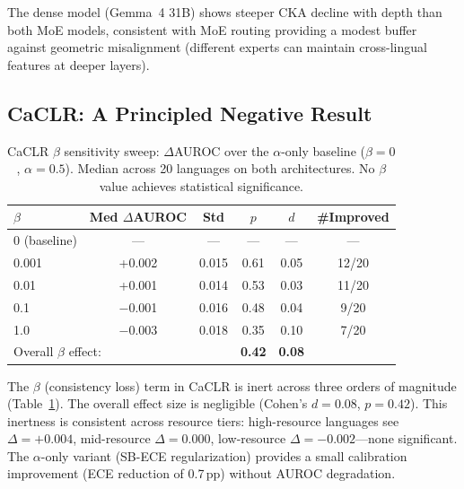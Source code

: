 \documentclass[11pt,a4paper]{article}
\begin{document}
The dense model (Gemma~4 31B) shows steeper CKA decline with depth than both MoE models, consistent with MoE routing providing a modest buffer against geometric misalignment (different experts can maintain cross-lingual features at deeper layers).

\subsection{CaCLR: A Principled Negative Result}
\label{sec:caclr_results}

\begin{table}[t]
\centering
\small
\caption{CaCLR $\beta$ sensitivity sweep: $\Delta$AUROC over the $\alpha$-only baseline ($\beta = 0$, $\alpha = 0.5$). Median across 20 languages on both architectures. No $\beta$ value achieves statistical significance.}
\label{tab:beta_sweep}
\begin{tabular}{lccccc}
\toprule
$\beta$ & \textbf{Med $\Delta$AUROC} & \textbf{Std} & \textbf{$p$} & \textbf{$d$} & \textbf{\#Improved} \\
\midrule
0 (baseline) & --- & --- & --- & --- & --- \\
0.001 & +0.002 & 0.015 & 0.61 & 0.05 & 12/20 \\
0.01 & +0.001 & 0.014 & 0.53 & 0.03 & 11/20 \\
0.1 & $-$0.001 & 0.016 & 0.48 & 0.04 & 9/20 \\
1.0 & $-$0.003 & 0.018 & 0.35 & 0.10 & 7/20 \\
\midrule
\multicolumn{2}{l}{Overall $\beta$ effect:} & & \textbf{0.42} & \textbf{0.08} & \\
\bottomrule
\end{tabular}
\end{table}

The $\beta$ (consistency loss) term in CaCLR is inert across three orders of magnitude (Table~\ref{tab:beta_sweep}). The overall effect size is negligible (Cohen's $d = 0.08$, $p = 0.42$). This inertness is consistent across resource tiers: high-resource languages see $\Delta = +0.004$, mid-resource $\Delta = 0.000$, low-resource $\Delta = -0.002$---none significant. The $\alpha$-only variant (SB-ECE regularization) provides a small calibration improvement (ECE reduction of 0.7\,pp) without AUROC degradation.
\end{document}
